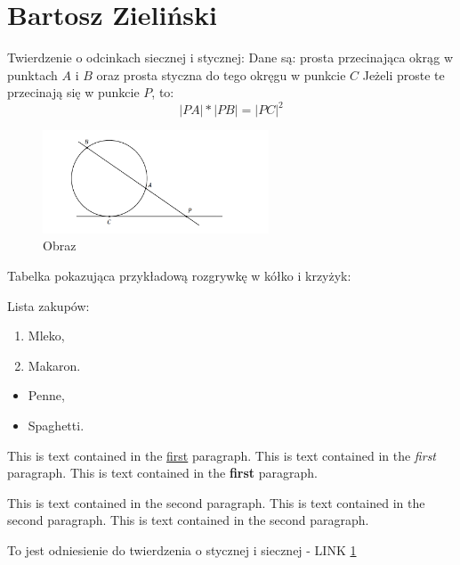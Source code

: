 \section{Bartosz Zieliński}

Twierdzenie o odcinkach siecznej i stycznej:
Dane są: prosta przecinająca okrąg w punktach \(A\) i \(B\) oraz prosta styczna do tego okręgu
w punkcie \(C\) Jeżeli proste te przecinają się w punkcie \(P\), to:
\[ |PA| * |PB| = |PC|^2 \]


\begin{figure}[htbp] 
\centering
\includegraphics[width=0.6\textwidth]{pictures/123.png}
\caption{\label{fig:123}Obraz}
\end{figure}

Tabelka pokazująca przykładową rozgrywkę w kółko i krzyżyk:



Lista zakupów:
\begin{enumerate}
\item Mleko,
\item Makaron.
\end{enumerate}
\begin{itemize}
\item Penne,
\item Spaghetti.
\end{itemize}


This is text contained in the \underline{first} paragraph. 
This is text contained in the \emph{first} paragraph. 
This is text contained in the \textbf{first}  paragraph.\par
This is text contained in the second paragraph. 
This is text contained in the second paragraph.
This is text contained in the second paragraph.

To jest odniesienie do twierdzenia o stycznej i siecznej - LINK \ref{fig:123}